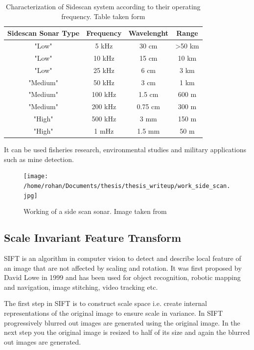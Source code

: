 \documentclass[12pt]{dalcsthesis}
\begin{document}
\begin{table}

\begin{tabular}{|c|c|c|c|}
\hline 
Sidescan Sonar Type & Frequency & Wavelenght & Range \\ 
\hline 
"Low" & 5 kHz & 30 cm & >50 km \\ 
\hline 
"Low" & 10 kHz & 15 cm & 10 km \\ 
\hline 
"Low" & 25 kHz & 6 cm & 3 km \\ 
\hline 
"Medium" & 50 kHz & 3 cm & 1 km \\ 
\hline 
"Medium" & 100 kHz & 1.5 cm & 600 m \\ 
\hline 
"Medium" & 200 kHz & 0.75 cm & 300 m \\ 
\hline 
"High" & 500 kHz & 3 mm & 150 m \\ 
\hline 
"High" & 1 mHz & 1.5 mm & 50 m \\ 
\hline 
\end{tabular} 
\caption{\label{tab-: classification of side scan} Characterization of Sidescan system according to their operating frequency. Table taken form \cite{side_sonar_usgs_url}} 
\end{table}
It can be used fisheries research, environmental studies and military applications such as mine detection. 

\begin{figure}
  \centering
     {\texttt{[image: /home/rohan/Documents/thesis/thesis\_writeup/work\_side\_scan.jpg]}}
  \caption{\label{fig- side scan sonar working} Working of a side scan sonar. Image taken from \cite{side_sonar_url}}
\end{figure}

\subsection{Scale Invariant Feature Transform}
SIFT is an algorithm in computer vision to detect and describe local feature of an image that are not affected by scaling and rotation. It was first proposed by David Lowe in 1999 \cite{lowe1999object} and has been used for object recognition, robotic mapping and navigation, image stitching, video tracking etc.

The first step in SIFT is to construct scale space i.e. create internal representations of the original image to ensure scale in variance. In SIFT progressively blurred out images are generated using the original image. In the next step you the original image is resized to half of its size and again the blurred out images are generated. 
\end{document}
